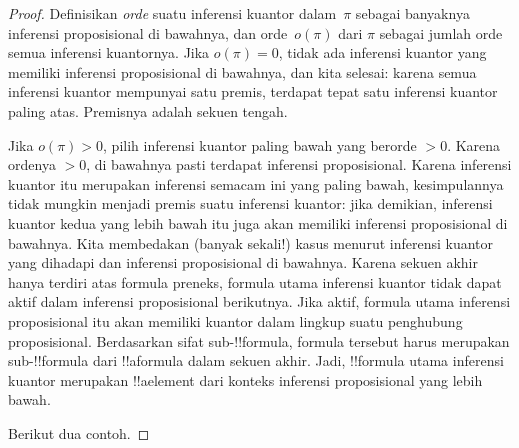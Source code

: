 \documentclass[../../../include/open-logic-section]{subfiles}
\begin{document}
\begin{proof}
  Definisikan \emph{orde} suatu inferensi kuantor dalam~$\pi$ sebagai
  banyaknya inferensi proposisional di bawahnya, dan orde~$o(\pi)$ dari
  $\pi$ sebagai jumlah orde semua inferensi kuantornya. Jika
  $o(\pi)=0$, tidak ada inferensi kuantor yang memiliki inferensi
  proposisional di bawahnya, dan kita selesai: karena semua inferensi
  kuantor mempunyai satu premis, terdapat tepat satu inferensi kuantor
  paling atas. Premisnya adalah sekuen tengah.

  Jika $o(\pi)>0$, pilih inferensi kuantor paling bawah yang berorde
  $>0$. Karena ordenya $>0$, di bawahnya pasti terdapat inferensi
  proposisional. Karena inferensi kuantor itu merupakan inferensi
  semacam ini yang paling bawah, kesimpulannya tidak mungkin menjadi
  premis suatu inferensi kuantor: jika demikian, inferensi kuantor kedua
  yang lebih bawah itu juga akan memiliki inferensi proposisional di
  bawahnya. Kita membedakan (banyak sekali!) kasus menurut inferensi
  kuantor yang dihadapi dan inferensi proposisional di bawahnya.
  Karena sekuen akhir hanya terdiri atas formula preneks, formula utama
  inferensi kuantor tidak dapat aktif dalam inferensi proposisional
  berikutnya. Jika aktif, formula utama inferensi proposisional itu akan
  memiliki kuantor dalam lingkup suatu penghubung proposisional.
  Berdasarkan sifat sub-!!{formula}, formula tersebut harus merupakan
  sub-!!{formula} dari !!a{formula} dalam sekuen akhir. Jadi, !!{formula}
  utama inferensi kuantor merupakan !!a{element} dari konteks inferensi
  proposisional yang lebih bawah.

  Berikut dua contoh.


\end{proof}
\end{document}
